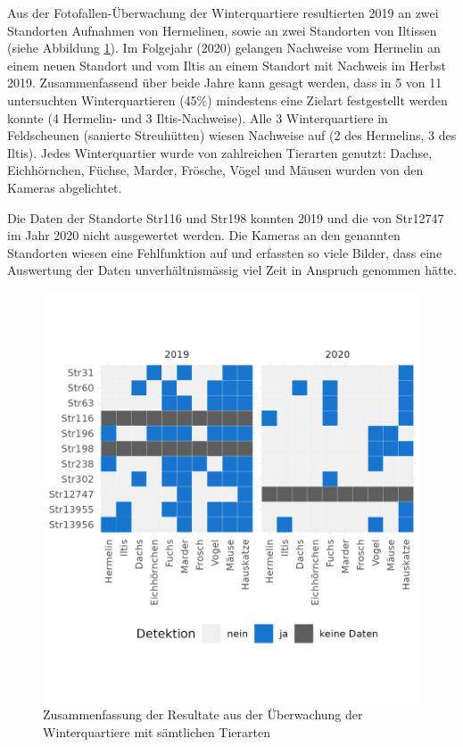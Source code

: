 \documentclass[
  oneside]{scrbook}
\begin{document}
Aus der Fotofallen-Überwachung der Winterquartiere resultierten 2019 an zwei Standorten Aufnahmen von Hermelinen, sowie an zwei Standorten von Iltissen (siehe Abbildung \ref{fig:winterquartiereresultate}). Im Folgejahr (2020) gelangen Nachweise vom Hermelin an einem neuen Standort und vom Iltis an einem Standort mit Nachweis im Herbst 2019. Zusammenfassend über beide Jahre kann gesagt werden, dass in 5 von 11 untersuchten Winterquartieren (45\%) mindestens eine Zielart festgestellt werden konnte (4 Hermelin- und 3 Iltis-Nachweise). Alle 3 Winterquartiere in Feldscheunen (sanierte Streuhütten) wiesen Nachweise auf (2 des Hermelins, 3 des Iltis).
Jedes Winterquartier wurde von zahlreichen Tierarten genutzt: Dachse, Eichhörnchen, Füchse, Marder, Frösche, Vögel und Mäusen wurden von den Kameras abgelichtet.

Die Daten der Standorte Str116 und Str198 konnten 2019 und die von Str12747 im Jahr 2020 nicht ausgewertet werden. Die Kameras an den genannten Standorten wiesen eine Fehlfunktion auf und erfassten so viele Bilder, dass eine Auswertung der Daten unverhältnismässig viel Zeit in Anspruch genommen hätte.

\begin{figure}
\includegraphics[width=1\linewidth]{images/winterquartiere_resultate} \caption{Zusammenfassung der Resultate aus der Überwachung der Winterquartiere mit sämtlichen Tierarten}\label{fig:winterquartiereresultate}
\end{figure}
\end{document}
